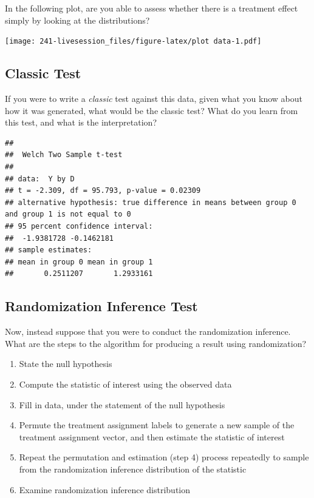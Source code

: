 \documentclass[
]{book}
\providecommand{\tightlist}{%
  \setlength{\itemsep}{0pt}\setlength{\parskip}{0pt}}
\begin{document}
In the following plot, are you able to assess whether there is a
treatment effect simply by looking at the distributions?

\texttt{[image: 241-livesession\_files/figure-latex/plot data-1.pdf]}

\hypertarget{classic-test}{%
\subsection{Classic Test}\label{classic-test}}

If you were to write a \emph{classic} test against this data, given what
you know about how it was generated, what would be the classic test?
What do you learn from this test, and what is the interpretation?

\begin{verbatim}
## 
##  Welch Two Sample t-test
## 
## data:  Y by D
## t = -2.309, df = 95.793, p-value = 0.02309
## alternative hypothesis: true difference in means between group 0 and group 1 is not equal to 0
## 95 percent confidence interval:
##  -1.9381728 -0.1462181
## sample estimates:
## mean in group 0 mean in group 1 
##       0.2511207       1.2933161
\end{verbatim}

\hypertarget{randomization-inference-test}{%
\subsection{Randomization Inference
Test}\label{randomization-inference-test}}

Now, instead suppose that you were to conduct the randomization
inference. What are the steps to the algorithm for producing a result
using randomization?

\begin{enumerate}
\def\labelenumi{\arabic{enumi}.}
\tightlist
\item
  State the null hypothesis
\item
  Compute the statistic of interest using the observed data
\item
  Fill in data, under the statement of the null hypothesis
\item
  Permute the treatment assignment labels to generate a new sample of
  the treatment assignment vector, and then estimate the statistic of
  interest
\item
  Repeat the permutation and estimation (step 4) process repeatedly to
  sample from the randomization inference distribution of the statistic
\item
  Examine randomization inference distribution
\end{enumerate}
\end{document}
